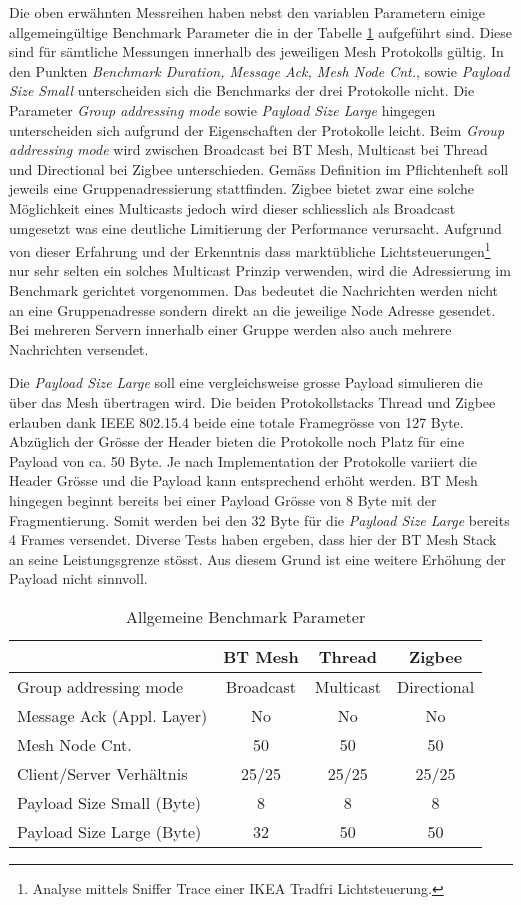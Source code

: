 Die oben erwähnten Messreihen haben nebst den variablen Parametern einige allgemeingültige Benchmark Parameter die in der Tabelle \ref{tab:AllgemeineBenchmarkParameter} aufgeführt sind.
Diese sind für sämtliche Messungen innerhalb des jeweiligen Mesh Protokolls gültig.
In den Punkten \textit{Benchmark Duration, Message Ack, Mesh Node Cnt.}, sowie \textit{Payload Size Small} unterscheiden sich die Benchmarks der drei Protokolle nicht.
Die Parameter \textit{Group addressing mode} sowie \textit{Payload Size Large} hingegen unterscheiden sich aufgrund der Eigenschaften der Protokolle leicht.
Beim \textit{Group addressing mode} wird zwischen Broadcast bei BT Mesh, Multicast bei Thread und Directional bei Zigbee unterschieden. Gemäss Definition im Pflichtenheft soll jeweils eine Gruppenadressierung stattfinden. Zigbee bietet zwar eine solche Möglichkeit eines Multicasts jedoch wird dieser schliesslich als Broadcast umgesetzt was eine deutliche Limitierung der Performance verursacht.
Aufgrund von dieser Erfahrung und der Erkenntnis dass marktübliche Lichtsteuerungen\footnote{Analyse mittels Sniffer Trace einer IKEA Tradfri Lichtsteuerung.} nur sehr selten ein solches Multicast Prinzip verwenden, wird die Adressierung im Benchmark gerichtet vorgenommen.
Das bedeutet die Nachrichten werden nicht an eine Gruppenadresse sondern direkt an die jeweilige Node Adresse gesendet. Bei mehreren Servern innerhalb einer Gruppe werden also auch mehrere Nachrichten versendet.

Die \textit{Payload Size Large} soll eine vergleichsweise grosse Payload simulieren die über das Mesh übertragen wird.
Die beiden Protokollstacks Thread und Zigbee erlauben dank IEEE 802.15.4 beide eine totale Framegrösse von 127 Byte.
Abzüglich der Grösse der Header bieten die Protokolle noch Platz für eine Payload von ca. 50 Byte. Je nach Implementation der Protokolle variiert die Header Grösse und die Payload kann entsprechend erhöht werden.
BT Mesh hingegen beginnt bereits bei einer Payload Grösse von 8 Byte mit der Fragmentierung. Somit werden bei den 32 Byte für die \textit{Payload Size Large} bereits 4 Frames versendet. Diverse Tests haben ergeben, dass hier der BT Mesh Stack an seine Leistungsgrenze stösst.
Aus diesem Grund ist eine weitere Erhöhung der Payload nicht sinnvoll.



\begin{table}[h]
\centering
\begin{tabular}{lccc} 
\toprule
 & BT Mesh & Thread & Zigbee \\ 
\hline
Group addressing mode & Broadcast & Multicast & Directional \\
Message Ack (Appl. Layer) & No & No & No \\
Mesh Node Cnt. & 50 & 50 & 50 \\
Client/Server Verhältnis & 25/25 & 25/25 & 25/25 \\
Payload Size Small (Byte) & 8 & 8 & 8 \\
Payload Size Large (Byte) & 32 & 50 & 50 \\
\bottomrule
\end{tabular}
\caption{Allgemeine Benchmark Parameter}
\label{tab:AllgemeineBenchmarkParameter}
\end{table}

